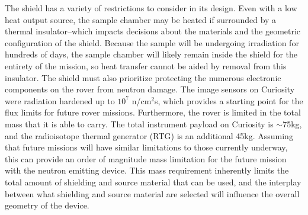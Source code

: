\documentclass{mc2015}
\begin{document}
The shield has a variety of restrictions to consider in its design. Even with a low heat output source, the sample chamber may be heated if surrounded by a thermal insulator--which impacts decisions about the materials and the geometric configuration of the shield.  Because the sample will be undergoing irradiation for hundreds of days, the sample chamber will likely remain inside the shield for the entirety of the mission, so heat transfer cannot be aided by removal from this insulator. The shield must also prioritize protecting the numerous electronic components on the rover from neutron damage. The image sensors on Curiosity were radiation hardened up to  $10^{7}$ n/cm$^2$s, which provides a starting point for the flux limits for future rover missions. Furthermore, the rover is limited in the total mass that it is able to carry. The total instrument payload on Curiosity is $\sim$75kg, and the radioisotope thermal generator (RTG) is an additional 45kg. Assuming that future missions will have similar limitations to those currently underway, this can provide an order of magnitude mass limitation for the future mission with the neutron emitting device. This mass requirement inherently limits the total amount of shielding and source material that can be used, and the interplay between what shielding and source material are selected will influence the overall geometry of the device. 
\end{document}
